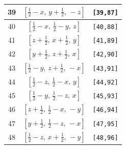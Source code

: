 \documentclass[fleqn,8pt]{jsarticle}
\begin{document}
\begin{longtable}{ccc}
39 & $\left[ \frac{1}{2} - x,\, y + \frac{1}{2},\, - z \right]$ & {\tt [39,87]} \\ \hline
40 & $\left[ \frac{1}{2} - x,\, \frac{1}{2} - y,\, z \right]$ & {\tt [40,88]} \\ \hline
41 & $\left[ z + \frac{1}{2},\, x + \frac{1}{2},\, y \right]$ & {\tt [41,89]} \\ \hline
42 & $\left[ y + \frac{1}{2},\, z + \frac{1}{2},\, x \right]$ & {\tt [42,90]} \\ \hline
43 & $\left[ \frac{1}{2} - y,\, z + \frac{1}{2},\, - x \right]$ & {\tt [43,91]} \\ \hline
44 & $\left[ \frac{1}{2} - z,\, \frac{1}{2} - x,\, y \right]$ & {\tt [44,92]} \\ \hline
45 & $\left[ \frac{1}{2} - y,\, \frac{1}{2} - z,\, x \right]$ & {\tt [45,93]} \\ \hline
46 & $\left[ z + \frac{1}{2},\, \frac{1}{2} - x,\, - y \right]$ & {\tt [46,94]} \\ \hline
47 & $\left[ y + \frac{1}{2},\, \frac{1}{2} - z,\, - x \right]$ & {\tt [47,95]} \\ \hline
48 & $\left[ \frac{1}{2} - z,\, x + \frac{1}{2},\, - y \right]$ & {\tt [48,96]} \\
\end{longtable}
\end{document}

